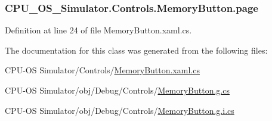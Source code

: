 \subsubsection[{page}]{ C\+P\+U\+\_\+\+O\+S\+\_\+\+Simulator.\+Controls.\+Memory\+Button.\+page\hspace{0.3cm}{\ttfamily [private]}}\label{class_c_p_u___o_s___simulator_1_1_controls_1_1_memory_button_a11e523d7bb59a28d303233a4198b1abe}


Definition at line 24 of file Memory\+Button.\+xaml.\+cs.



The documentation for this class was generated from the following files\+:\begin{DoxyCompactItemize}
\item 
C\+P\+U-\/\+O\+S Simulator/\+Controls/\hyperlink{_memory_button_8xaml_8cs}{Memory\+Button.\+xaml.\+cs}\item 
C\+P\+U-\/\+O\+S Simulator/obj/\+Debug/\+Controls/\hyperlink{_memory_button_8g_8cs}{Memory\+Button.\+g.\+cs}\item 
C\+P\+U-\/\+O\+S Simulator/obj/\+Debug/\+Controls/\hyperlink{_memory_button_8g_8i_8cs}{Memory\+Button.\+g.\+i.\+cs}\end{DoxyCompactItemize}
